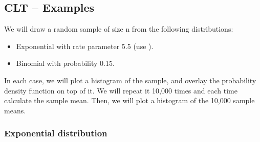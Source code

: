 \subsection{CLT -- Examples}
We will draw a random sample of size n from the following distributions:
\begin{itemize}
\item Exponential with rate parameter 5.5 (use ).
\item Binomial with probability 0.15.
\end{itemize}

In each case, we will plot a histogram of the sample, and overlay the probability density function on top of it.  We will repeat it 10,000 times and each time calculate the sample mean. Then, we will plot a histogram of the 10,000 sample means.

\subsubsection{Exponential distribution}

